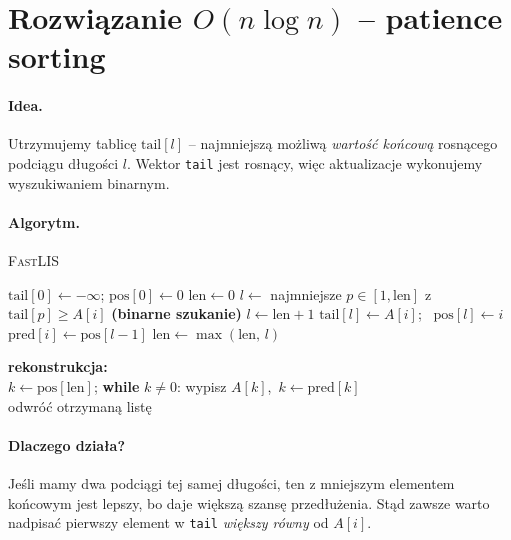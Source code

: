 \documentclass[11pt,a4paper]{article}
\begin{document}
\section*{Rozwiązanie $O(n\log n)$ – patience sorting}

\paragraph{Idea.}
Utrzymujemy tablicę \(
  \text{tail}[l]
\) –
najmniejszą możliwą \emph{wartość końcową}
rosnącego podciągu długości $l$.
Wektor \texttt{tail} jest rosnący, więc
aktualizacje wykonujemy wyszukiwaniem binarnym.

\paragraph{Algorytm.}
\begin{algorithm}[H]
\caption{\textsc{FastLIS}}
\begin{algorithmic}[1]
\State $\text{tail}[0]\gets-\infty$;\;
       $\text{pos}[0]\gets0$     
\State $\text{len}\gets0$
   \State $l\gets$ najmniejsze $p\in[1,\text{len}]$
          z $\text{tail}[p]\ge A[i]$
          \textbf{(binarne szukanie)}  
    $l\gets\text{len}+1$
   \State $\text{tail}[l]\gets A[i]$; \,
          $\text{pos}[l]\gets i$      
   \State $\text{pred}[i]\gets\text{pos}[l-1]$ 
   \State $\text{len}\gets\max(\text{len},\,l)$
\EndFor
\State
\begin{minipage}[t]{0.9\linewidth}
\textbf{rekonstrukcja:}\\
$k\gets\text{pos}[\text{len}]$;\quad
\textbf{while} $k\neq0$:
  wypisz $A[k]$,\, $k\gets\text{pred}[k]$\\
odwróć otrzymaną listę
\end{minipage}
\State {}
\end{algorithmic}
\end{algorithm}

\paragraph{Dlaczego działa?}
Jeśli mamy dwa podciągi tej samej długości,
ten z mniejszym elementem końcowym jest lepszy,
bo daje większą szansę przedłużenia.
Stąd zawsze warto nadpisać
pierwszy element w \texttt{tail}
\emph{większy równy} od $A[i]$.
\end{document}
